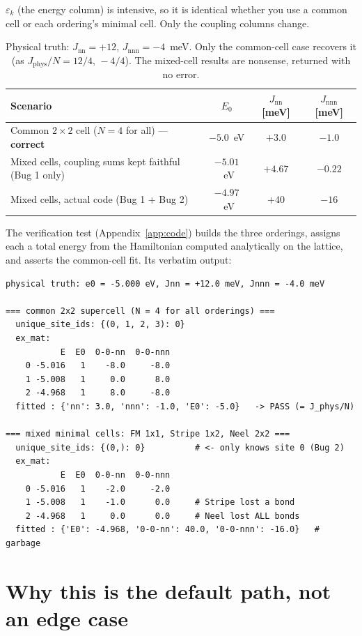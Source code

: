 \documentclass[11pt]{article}
\begin{document}
$\varepsilon_k$ (the energy column) is intensive, so it is identical whether you
use a common cell or each ordering's minimal cell. Only the coupling columns
change.

\begin{table}[h]
\centering
\begin{tabularx}{\textwidth}{@{}X c c c@{}}
\toprule
Scenario & $E_0$ & $J_{\mathrm{nn}}$ [meV] & $J_{\mathrm{nnn}}$ [meV] \\
\midrule
Common $2\times2$ cell ($N=4$ for all) --- \textbf{correct} & $-5.0$~eV & $+3.0$ & $-1.0$ \\
Mixed cells, coupling sums kept faithful (Bug 1 only)        & $-5.01$~eV & $+4.67$ & $-0.22$ \\
Mixed cells, actual code (Bug 1 + Bug 2)                     & $-4.97$~eV & $+40$ & $-16$ \\
\bottomrule
\end{tabularx}
\caption{Physical truth: $J_{\mathrm{nn}}=+12$, $J_{\mathrm{nnn}}=-4$~meV. Only
the common-cell case recovers it (as $J_{\mathrm{phys}}/N = 12/4,\,-4/4$). The
mixed-cell results are nonsense, returned with no error.}
\label{tab:outcomes}
\end{table}

The verification test (Appendix~\ref{app:code}) builds the three orderings,
assigns each a total energy from the Hamiltonian computed analytically on the
lattice, and asserts the common-cell fit. Its verbatim output:

\begin{lstlisting}[style=plain]
physical truth: e0 = -5.000 eV, Jnn = +12.0 meV, Jnnn = -4.0 meV

=== common 2x2 supercell (N = 4 for all orderings) ===
  unique_site_ids: {(0, 1, 2, 3): 0}
  ex_mat:
           E  E0  0-0-nn  0-0-nnn
    0 -5.016   1    -8.0     -8.0
    1 -5.008   1     0.0      8.0
    2 -4.968   1     8.0     -8.0
  fitted : {'nn': 3.0, 'nnn': -1.0, 'E0': -5.0}   -> PASS (= J_phys/N)

=== mixed minimal cells: FM 1x1, Stripe 1x2, Neel 2x2 ===
  unique_site_ids: {(0,): 0}          # <- only knows site 0 (Bug 2)
  ex_mat:
           E  E0  0-0-nn  0-0-nnn
    0 -5.016   1    -2.0     -2.0
    1 -5.008   1    -1.0      0.0     # Stripe lost a bond
    2 -4.968   1     0.0      0.0     # Neel lost ALL bonds
  fitted : {'E0': -4.968, '0-0-nn': 40.0, '0-0-nnn': -16.0}   # garbage
\end{lstlisting}

\section{Why this is the default path, not an edge case}
\label{sec:trigger}
\end{document}
